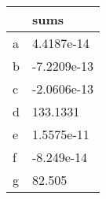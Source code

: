 \begin{tabular}{ll}
& sums \\ 
\hline 
a & 4.4187e-14 \\ 
b & -7.2209e-13 \\ 
c & -2.0606e-13 \\ 
d & 133.1331 \\ 
e & 1.5575e-11 \\ 
f & -8.249e-14 \\ 
g & 82.505 \\ 
\hline 
\end{tabular}